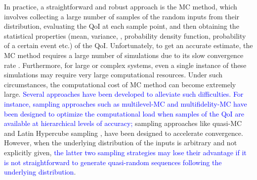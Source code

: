 In practice, a straightforward and robust approach is the \ac{MC} method, which involves collecting 
a large number of samples of the random inputs from their distribution, evaluating 
the \ac{QoI} at each sample point, and then obtaining the statistical properties (mean, variance, , 
probability density function, probability of a certain event etc.) of the \ac{QoI}. Unfortunately, to 
get an accurate estimate, the \ac{MC} method requires a large number of simulations due to
its slow convergence rate \cite{Fishman96, Kucherenko_2015}. Furthermore, for large or complex systems, even a single 
instance of these simulations may require very large computational resources. Under such circumstances, 
the computational cost of \ac{MC} method can become extremely large. \textcolor{blue}{Several approaches have been developed to 
alleviate such difficulties. 
For instance, sampling approaches such as multilevel-\ac{MC} \cite{Giles_2015,Heinrich_MLMC_2001,Pisaroni_Nobile_CMAME_2017}
and multifidelity-\ac{MC} \cite{Koutsourelakis_SISC_2009, Peherstorfer_Willcox_SISC_2016} have 
been designed to optimize the computational load when samples of 
the \ac{QoI} are available at hierarchical levels of accuracy;} sampling approaches like quasi-\ac{MC} 
\cite{Fox99,Niedeereiter92,NiederreiterHLZ98} and Latin Hypercube sampling 
\cite{Mckay_Beckman_Technometrics_1979,Stein_tech87,Loh_AS96}, have been designed to accelerate convergence. 
However, when the underlying distribution of the inputs is arbitrary and not explicitly given, 
\textcolor{blue}{the latter two sampling strategies may lose their advantage if it 
is not straightforward to generate quasi-random sequences following the underlying distribution}. 

